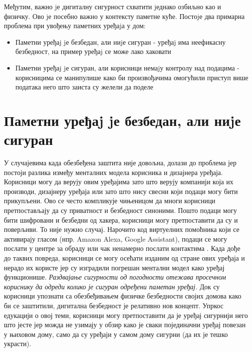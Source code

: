 \documentclass[a4paper]{article}
\begin{document}
Међутим, важно jе дигиталну сигурност схватити jеднако озбиљно као и физичку. Ово jе посебно важно у контексту паметне куће.
Постоjе два примарна проблема при увођењу паметних уређаjа у дом:
\begin{itemize}
    \item Паметни уређаj jе безбедан, али ниjе сигуран - уређаj има неефикасну безбедност, на пример уређаj се може лако хаковати
    \item Паметни уређаj jе сигуран, али корисници немаjу контролу над подацима - корисницима се манипулише како би произвођачима
    омогућили приступ више података него што заиста су желели да поделе
\end{itemize}

\section{Паметни уређаj jе безбедан, али ниjе сигуран}
У случајевима када обезбеђена заштита није довољна, долази до проблема јер постоји разлика између менталних модела корисника и
дизајнера уређаја. Корисници могу да верују овим уређајима зато што верују компанији која их производи, дизајнеру уређаја или зато
што нису свесни који подаци могу бити прикупљени. Ово се често компликује чињеницом да многи корисници претпостављају да су приватност и
безбедност синоними. Пошто подаци могу бити шифровани и безбедни од хакера, корисници могу претпоставити да су и поверљиви. То није нужно случај.
Нарочито код виртуелних помоћника који се активирају гласом (нпр. Amazon Alexa, Google Assistant), подаци се могу послати у центре за обраду или
чак ненамерно послати контактима \cite{4} \cite{5}. Када дође до таквих повреда, корисници се могу осећати изданим од стране ових уређаја и нерадо их
користе јер су изградили погрешан ментални модел како уређај функционише.
\newline \newline
\emph{Раздвајање сигурности од погодности отежава просечном кориснику да одреди колико је сигуран одређени паметан уређај.}
\newline  \newline
Док су корисници упознати са обезбеђивањем физичке безбедности својих домова како би се заштитили, дигитална безбедност је релативно
нов концепт. Упркос едукацији о овој теми, корисници могу претпоставити да је уређај сигурнији него што јесте јер можда не узимају
у обзир како је сваки појединачни уређај повезан у њиховом дому, само да су уређаји у самом дому сигурни (да их је тешко украсти).
\newline  \newline
\end{document}
